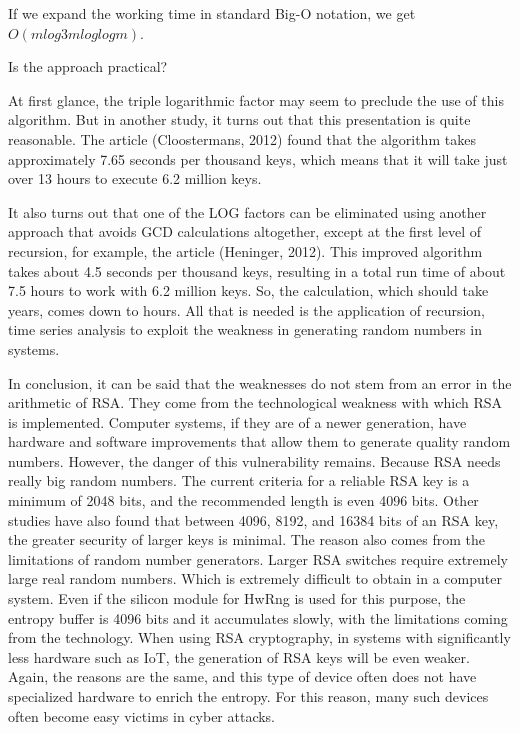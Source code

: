 \documentclass[graybox]{svmult}
\begin{document}
If we expand the working time in standard Big-O notation, we get $O (m log3 m log log m)$. 

Is the approach practical?

At first glance, the triple logarithmic factor may seem to preclude the use of this algorithm. But in another study, it turns out that this presentation is quite reasonable. The article (Cloostermans, 2012) found that the algorithm takes approximately 7.65 seconds per thousand keys, which means that it will take just over 13 hours to execute 6.2 million keys.

It also turns out that one of the LOG factors can be eliminated using another approach that avoids GCD calculations altogether, except at the first level of recursion, for example, the article (Heninger, 2012). This improved algorithm takes about 4.5 seconds per thousand keys, resulting in a total run time of about 7.5 hours to work with 6.2 million keys. So, the calculation, which should take years, comes down to hours. All that is needed is the application of recursion, time series analysis to exploit the weakness in generating random numbers in systems.

In conclusion, it can be said that the weaknesses do not stem from an error in the arithmetic of RSA. They come from the technological weakness with which RSA is implemented. Computer systems, if they are of a newer generation, have hardware and software improvements that allow them to generate quality random numbers. However, the danger of this vulnerability remains. Because RSA needs really big random numbers. The current criteria for a reliable RSA key is a minimum of 2048 bits, and the recommended length is even 4096 bits. Other studies have also found that between 4096, 8192, and 16384 bits of an RSA key, the greater security of larger keys is minimal. The reason also comes from the limitations of random number generators. Larger RSA switches require extremely large real random numbers. Which is extremely difficult to obtain in a computer system. Even if the silicon module for HwRng is used for this purpose, the entropy buffer is 4096 bits and it accumulates slowly, with the limitations coming from the technology. When using RSA cryptography, in systems with significantly less hardware such as IoT, the generation of RSA keys will be even weaker. Again, the reasons are the same, and this type of device often does not have specialized hardware to enrich the entropy. For this reason, many such devices often become easy victims in cyber attacks.
\end{document}
